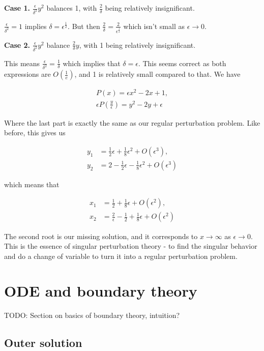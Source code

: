 \documentclass[12pt]{article}
\begin{document}
\textbf{Case 1.} $\frac{\epsilon}{\delta^2} y^2$ balances 1, with $\frac{2}{\delta}$
being relatively insignificant.

$\frac{\epsilon}{\delta^2} = 1$ implies $\delta = \epsilon^{\frac{1}{2}}$. But
then $\frac{2}{\delta} = \frac{2}{\epsilon^{\frac{1}{2}}}$ which isn't small as
$\epsilon \to 0$.

\textbf{Case 2.} $\frac{\epsilon}{\delta^2} y^2$ balance $\frac{2}{\delta} y$,
with 1 being relatively insignificant.

This means $\frac{\epsilon}{\delta^2} = \frac{1}{\delta}$ which implies that
$\delta = \epsilon$. This seems correct as both expressions are
$O(\frac{1}{e})$, and 1 is relatively small compared to that. We have

\begin{align}
P(x) = \epsilon x^2 - 2x + 1, \\
\epsilon P(\frac{y}{\epsilon}) = y^2 - 2 y + \epsilon
\end{align}

Where the last part is exactly the same as our regular perturbation problem.
Like before, this gives us

\begin{align}
y_1 &= \frac{1}{2} \epsilon + \frac{1}{8} \epsilon^2 + O(\epsilon^3), \\
y_2 &= 2 - \frac{1}{2} \epsilon - \frac{1}{8} \epsilon^2 + O(\epsilon^3)
\end{align}

which means that

\begin{align}
x_1 &= \frac{1}{2} + \frac{1}{8} \epsilon + O(\epsilon^2), \\
x_2 &= \frac{2}{\epsilon} - \frac{1}{2} + \frac{1}{8} \epsilon + O(\epsilon^2)
\end{align}

The second root is our missing solution, and it corresponds to $x \to \infty$ as
$\epsilon \to 0$. This is the essence of singular perturbation theory - to find
the singular behavior and do a change of variable to turn it into a regular
perturbation problem.

\section{ODE and boundary theory}

TODO: Section on basics of boundary theory, intuition?

\subsection{Outer solution}
\end{document}
